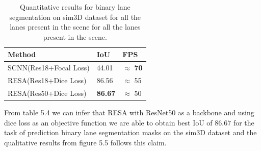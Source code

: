            \begin{table}[h]
    \caption{Quantitative results for binary lane segmentation on sim3D dataset for all the lanes present in the scene for all the lanes present in the scene.}
    \centering
    \begin{tabular}{|l|l|l|}
    \hline
        \textbf{Method} & \textbf{IoU} & \textbf{FPS} \\ \hline
        SCNN(Res18+Focal Loss) & 44.01 & $\approx$ \textbf{70} \\\hline
        RESA(Res18+Dice Loss) & 86.56 & $\approx$ 55 \\\hline
        RESA(Res50+Dice Loss) & \textbf{86.67} & $\approx$ 50 \\\hline
    \end{tabular}
\end{table}
        From table 5.4 we can infer that RESA with ResNet50 as a backbone and using dice loss as an objective function we are able to obtain best IoU of $86.67$ for the task of prediction binary lane segmentation masks on the sim3D dataset \cite{} and the qualitative results from figure 5.5 follows this claim. 
